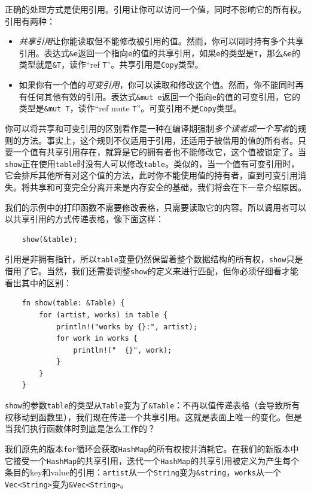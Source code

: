正确的处理方式是使用引用。引用让你可以访问一个值，同时不影响它的所有权。引用有两种：
\begin{itemize}
    \item \emph{共享引用}让你能读取但不能修改被引用的值。然而，你可以同时持有多个共享引用。表达式\texttt{\&e}返回一个指向\texttt{e}的值的共享引用，如果\texttt{e}的类型是\texttt{T}，那么\texttt{\&e}的类型就是\texttt{\&T}，读作“ref \texttt{T}”。共享引用是\texttt{Copy}类型。
    \item 如果你有一个值的\emph{可变引用}，你可以读取和修改这个值。然而，你不能同时再有任何其他有效的引用。表达式\texttt{\&mut e}返回一个指向\texttt{e}的值的可变引用，它的类型是\texttt{\&mut T}，读作“ref mute \texttt{T}”。可变引用不是\texttt{Copy}类型。
\end{itemize}

你可以将共享和可变引用的区别看作是一种在编译期强制\emph{多个读者或一个写者}的规则的方法。事实上，这个规则不仅适用于引用，还适用于被借用的值的所有者。只要一个值有共享引用存在，就算是它的拥有者也不能修改它，这个值被锁定了。当\texttt{show}正在使用\texttt{table}时没有人可以修改\texttt{table}。类似的，当一个值有可变引用时，它会排斥其他所有对这个值的方法，此时你不能使用值的持有者，直到可变引用消失。将共享和可变完全分离开来是内存安全的基础，我们将会在下一章介绍原因。

我们的示例中的打印函数不需要修改表格，只需要读取它的内容。所以调用者可以以共享引用的方式传递表格，像下面这样：
\begin{verbatim}
    show(&table);
\end{verbatim}

引用是非拥有指针，所以\texttt{table}变量仍然保留着整个数据结构的所有权，\texttt{show}只是借用了它。当然，我们还需要调整\texttt{show}的定义来进行匹配，但你必须仔细看才能看出其中的区别：

\begin{verbatim}
    fn show(table: &Table) {
        for (artist, works) in table {
            println!("works by {}:", artist);
            for work in works {
                println!("  {}", work);
            }
        }
    }
\end{verbatim}

\texttt{show}的参数\texttt{table}的类型从\texttt{Table}变为了\texttt{\&Table}：不再以值传递表格（会导致所有权移动到函数里），我们现在传递一个共享引用。这就是表面上唯一的变化。但是当我们执行函数体时到底是怎么工作的？

我们原先的版本\texttt{for}循环会获取\texttt{HashMap}的所有权按并消耗它。在我们的新版本中它接受一个\texttt{HashMap}的共享引用，迭代一个\texttt{HashMap}的共享引用被定义为产生每个条目的key和value的引用：\texttt{artist}从一个\texttt{String}变为\texttt{\&string}，\texttt{works}从一个\texttt{Vec<String>}变为\texttt{\&Vec<String>}。

